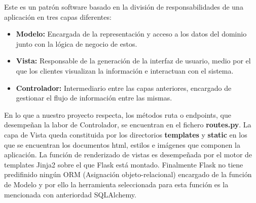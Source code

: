 Este es un patrón software basado en la división de responsabilidades de una aplicación en tres capas diferentes:
\begin{itemize}
\item \textbf{Modelo:} Encargada de la representación y acceso a los datos del dominio junto con la lógica de negocio de estos.

\item \textbf{Vista:} Responsable de la generación de la interfaz de usuario, medio por el que los clientes visualizan la información e interactuan con el sistema.

\item \textbf{Controlador:} Intermediario entre las capas anteriores, encargado de gestionar el flujo de información entre las mismas.

\end{itemize}

En lo que a nuestro proyecto respecta, los métodos ruta o endpoints, que desempeñan la labor de Controlador, se encuentran en el fichero \textbf{routes.py}. La capa de Vista queda constituida por los directorios \textbf{templates} y \textbf{static} en los que se encuentran los documentos html, estilos e imágenes que componen la aplicación. La función de renderizado de vistas es desempeñada por el motor de templates Jinja2 sobre el que Flask está montado. Finalmente Flask no tiene predifinido ningún ORM (Asignación objeto-relacional) encargado de la función de Modelo y por ello la herramienta seleccionada para esta función es la mencionada con anteriordad SQLAlchemy.




